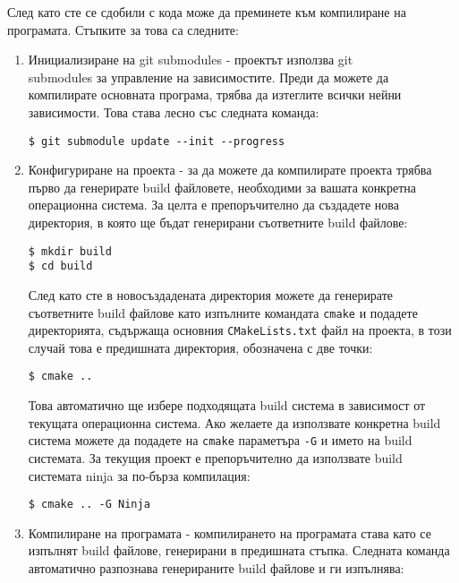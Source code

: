 След като сте се сдобили с кода може да преминете към компилиране на
програмата. Стъпките за това са следните:

\begin{enumerate}
    \item Инициализиране на git submodules - проектът използва git \\
          submodules за управление на зависимостите. Преди да можете да
          компилирате основната програма, трябва да изтеглите всички нейни
          зависимости. Това става лесно със следната команда:
    
\begin{lstlisting}[style=shell]
$ git submodule update --init --progress
\end{lstlisting}

    \item Конфигуриране на проекта - за да можете да компилирате проекта трябва
          първо да генерирате build файловете, необходими за вашата конкретна
          операционна система. За целта е препоръчително да създадете нова
          директория, в която ще бъдат генерирани съответните build файлове:

\begin{lstlisting}[style=shell]
$ mkdir build
$ cd build
\end{lstlisting}

След като сте в новосъздадената директория можете да генерирате съответните
build файлове като изпълните командата \texttt{cmake} и подадете директорията,
съдържаща основния \texttt{CMakeLists.txt} файл на проекта, в този случай това
е предишната директория, обозначена с две точки:

\begin{lstlisting}[style=shell]
$ cmake ..
\end{lstlisting}

Това автоматично ще избере подходящата build система в зависимост от текущата
операционна система. Ако желаете да използвате конкретна build система можете да
подадете на \texttt{cmake} параметъра \texttt{-G} и името на build системата. За
текущия проект е препоръчително да използвате build системата ninja за по-бърза
компилация:

\begin{lstlisting}[style=shell]
$ cmake .. -G Ninja
\end{lstlisting}

    \item Компилиране на програмата - компилирането на програмата става като се
          изпълнят build файлове, генерирани в предишната стъпка. Следната
          команда автоматично разпознава генерираните build файлове и ги
          изпълнява:


\end{enumerate}
